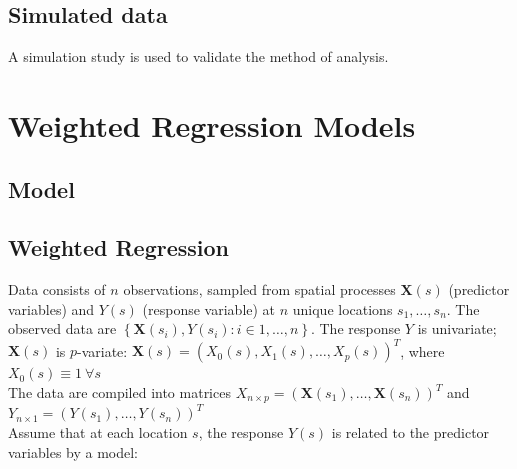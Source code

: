 \documentclass[authoryear, review, 11pt]{elsarticle}
\begin{document}
	\subsection{Simulated data}
		A simulation study is used to validate the method of analysis.\\
	
\section{Weighted Regression Models}

	\subsection{Model}
	
	\subsection{Weighted Regression}
	
	Data consists of $n$ observations, sampled from spatial processes $\bm{X}(s)$ (predictor variables) and $Y(s)$ (response variable) at $n$ unique locations $s_1, \dots, s_n$. The observed data are $\left\{ \bm{X}(s_i) , Y(s_i) : i \in 1, \dots, n \right\}$. The response $Y$ is univariate; $\bm{X}(s)$ is $p$-variate: $\bm{X}(s) = (X_0(s), X_1(s), \dots, X_p(s))^T$, where $X_0(s) \equiv 1 \: \forall s$ \\
	
	The data are compiled into matrices $X_{n \times p} = \left( \bm{X}(s_1), \dots, \bm{X}(s_n) \right)^T$ and $Y_{n \times 1} = \left(Y(s_1), \dots, Y(s_n) \right)^T$\\
		
	Assume that at each location $s$, the response $Y(s)$ is related to the predictor variables by a model:\\
	
\end{document}
